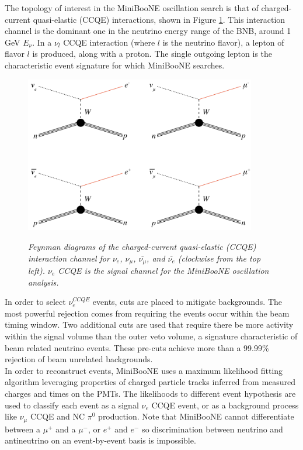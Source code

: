 The topology of interest in the MiniBooNE oscillation search is that of charged-current quasi-elastic (CCQE) interactions, shown in Figure \ref{georgia_ccqe_feynman_fig}. This interaction channel is the dominant one in the neutrino energy range of the BNB, around 1 GeV $E_\nu$. In a $\nu_l$ CCQE interaction (where $l$ is the neutrino flavor), a lepton of flavor $l$ is produced, along with a proton. The single outgoing lepton is the characteristic event signature for which MiniBooNE searches.\\


\begin{figure}[ht!]
\centering
	\includegraphics[width=0.9\textwidth]{Figures/georgia_ccqe_feynman.png} \\
\caption{\textit{Feynman diagrams of the charged-current quasi-elastic (CCQE) interaction channel for $\nu_e$, $\nu_\mu$, $\overline{\nu_\mu}$, and $\overline{\nu_e}$ (clockwise from the top left). $\nu_e$ CCQE is the signal channel for the MiniBooNE oscillation analysis.}}\label{georgia_ccqe_feynman_fig}
\end{figure}


In order to select $\nu_e^{CCQE}$ events, cuts are placed to mitigate backgrounds. The most powerful rejection comes from requiring the events occur within the beam timing window. Two additional cuts are used that require there be more activity within the signal volume than the outer veto volume, a signature characteristic of beam related neutrino events. These pre-cuts achieve more than a 99.99\% rejection of beam unrelated backgrounds.\\

In order to reconstruct events, MiniBooNE uses a maximum likelihood fitting algorithm leveraging properties of charged particle tracks inferred from measured charges and times on the PMTs. The likelihoods to different event hypothesis are used to classify each event as a signal $\nu_e$ CCQE event, or as a background process like $\nu_\mu$ CCQE and NC $\pi^0$ production. Note that MiniBooNE cannot differentiate between a $\mu^+$ and a $\mu^-$, or $e^+$ and $e^-$ so discrimination between neutrino and antineutrino on an event-by-event basis is impossible.\\

